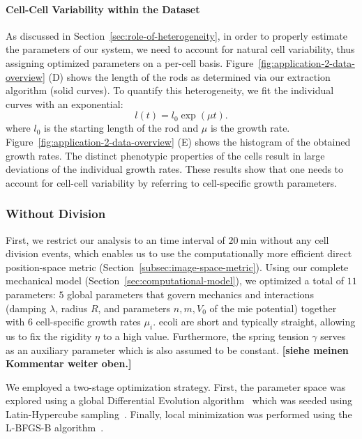 \documentclass[10pt,letterpaper]{article}
\begin{document}
\paragraph{Cell-Cell Variability within the Dataset}
\label{paragraph:parameter-estimation-individual-treatment}

As discussed in Section~\ref{sec:role-of-heterogeneity}, in order to properly estimate the
parameters of our system, we need to account for natural cell variability, thus assigning optimized
parameters on a per-cell basis.
Figure~\ref{fig:application-2-data-overview} (D) shows the length of the rods as determined via our
extraction algorithm (solid curves). To quantify this heterogeneity, we fit the individual curves
with an exponential:
\begin{equation}
    l(t) = l_0 \exp(\mu t).
    \label{eq:exponential-growth-model}
\end{equation}
where $l_0$ is the starting length of the rod and $\mu$ is the growth rate.
Figure~\ref{fig:application-2-data-overview} (E) shows the histogram of the obtained growth rates.
The distinct phenotypic properties of the cells result in large deviations of the individual growth
rates.
These results show that one needs to account for cell-cell variability by referring to cell-specific
growth parameters.

\subsubsection{Without Division}
First, we restrict our analysis to an time interval of $\SI{20}{\minute}$ without any cell division
events, which enables us to use the computationally more efficient direct position-space metric
(Section~\ref{subsec:image-space-metric}).
Using our complete mechanical model (Section~\ref{sec:computational-model}), we optimized a total
of $11$ parameters: $5$ global parameters that govern mechanics and interactions (damping
$\lambda$, radius $R$, and parameters $n,m,V_0$ of the mie potential) together with $6$
cell-specific growth rates $\mu_i$.
\ac{ecoli} are short and typically straight, allowing us to fix the rigidity $\eta$ to a high value.
Furthermore, the spring tension $\gamma$ serves as an auxiliary parameter which is also assumed to
be constant.
{\bf [siehe meinen Kommentar weiter oben.]}

We employed a two-stage optimization strategy.
First, the parameter space was explored using a global Differential Evolution
algorithm~\cite{Storn1997} which was seeded using Latin-Hypercube sampling~\cite{McKay1979}.
Finally, local minimization was performed using the L-BFGS-B algorithm~\cite{Liu1989}.
\end{document}
